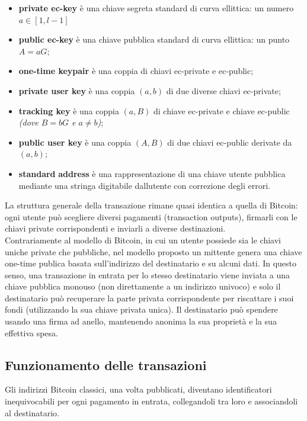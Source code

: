 \begin{itemize}
  \item
    \textbf{private ec-key} è una chiave segreta standard di curva
    ellittica: un numero $a \in [1,l-1]$
  \item
    \textbf{public ec-key} è una chiave pubblica standard di curva
    ellittica: un punto $A=aG$;
  \item
    \textbf{one-time keypair} è una coppia di chiavi ec-private e
    ec-public;
  \item
    \textbf{private user key} è una coppia \emph{$(a, b)$} di due diverse
    chiavi ec-private;
  \item
    \textbf{tracking key} è una coppia \emph{$(a, B)$} di chiave ec-private
    e chiave ec-public \emph{(dove $B=bG$ e $a \neq b$)};
  \item
    \textbf{public user key} è una coppia \emph{$(A, B)$} di due chiavi
    ec-public derivate da \emph{$(a, b)$};
  \item
    \textbf{standard} \textbf{address} è una rappresentazione di una
    chiave utente pubblica mediante una stringa digitabile
    dall\textquotesingle utente con correzione degli errori.
  \end{itemize}

La struttura generale della transazione rimane quasi identica a quella
di Bitcoin: ogni utente può scegliere diversi pagamenti (transaction
outputs), firmarli con le chiavi private corrispondenti e inviarli a
diverse destinazioni.\\
Contrariamente al modello di Bitcoin, in cui un utente possiede sia le
chiavi uniche private che pubbliche, nel modello proposto un mittente
genera una chiave one-time publica basata sull'indirizzo del
destinatario e su alcuni dati. In questo senso, una transazione in
entrata per lo stesso destinatario viene inviata a una chiave pubblica
monouso (non direttamente a un indirizzo univoco) e solo il destinatario
può recuperare la parte privata corrispondente per riscattare i suoi
fondi (utilizzando la sua chiave privata unica). Il destinatario può
spendere usando una firma ad anello, mantenendo anonima la sua proprietà
e la sua effettiva spesa.

\subsection{Funzionamento delle
transazioni}\label{funzionamento-delle-transazioni}

Gli indirizzi Bitcoin classici, una volta pubblicati, diventano
identificatori inequivocabili per ogni pagamento in entrata,
collegandoli tra loro e associandoli al destinatario.

